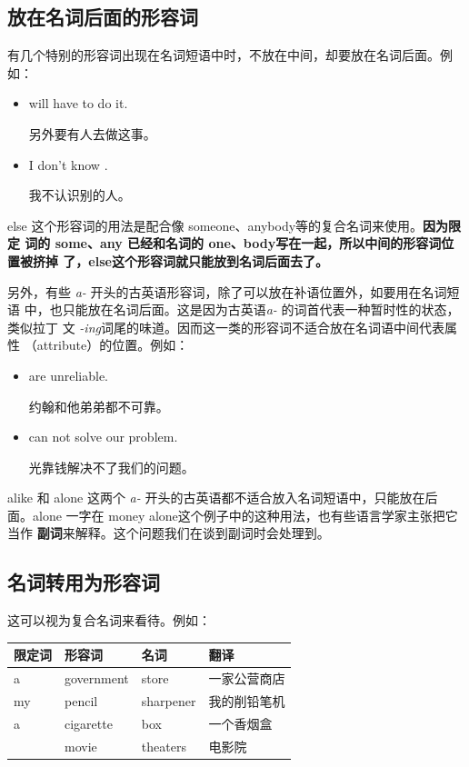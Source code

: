 \subsection{放在名词后面的形容词}

有几个特别的形容词出现在名词短语中时，不放在中间，却要放在名词后面。例如：

\begin{itemize}
\item  {} will have to do it.

  另外要有人去做这事。
\item  I don't know .

  我不认识别的人。
\end{itemize}

else 这个形容词的用法是配合像 someone、anybody等的复合名词来使用。\textbf{因为限定
  词的 some、any 已经和名词的 one、body写在一起，所以中间的形容词位置被挤掉
  了，else这个形容词就只能放到名词后面去了。}

另外，有些 \emph{a-} 开头的古英语形容词，除了可以放在补语位置外，如要用在名词短语
中，也只能放在名词后面。这是因为古英语\emph{a-} 的词首代表一种暂时性的状态，类似拉丁
文 \emph{-ing}词尾的味道。因而这一类的形容词不适合放在名词语中间代表属性
（attribute）的位置。例如：

\begin{itemize}
\item  {} are unreliable.

  约翰和他弟弟都不可靠。
\item  {} can not solve our problem.

  光靠钱解决不了我们的问题。
\end{itemize}

alike 和 alone 这两个 \emph{a-} 开头的古英语都不适合放入名词短语中，只能放在后
面。alone 一字在 money alone这个例子中的这种用法，也有些语言学家主张把它当作
\textbf{副词}来解释。这个问题我们在谈到副词时会处理到。

\subsection{名词转用为形容词}

这可以视为复合名词来看待。例如：

\begin{longtable}[]{@{}llll@{}}
  \toprule\noalign{}
  限定词 & 形容词 & 名词 & 翻译\\
  \midrule\noalign{}
  \endhead
  \bottomrule\noalign{}
  \endlastfoot
  a & government & store & 一家公营商店 \\
  my & pencil & sharpener & 我的削铅笔机 \\
  a & cigarette & box & 一个香烟盒 \\
         & movie & theaters & 电影院 \\
\end{longtable}

